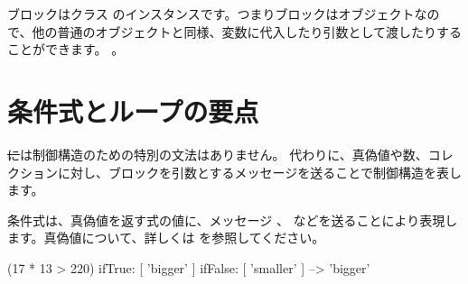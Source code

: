 \documentclass[a4paper,10pt,twoside]{book}
\begin{document}
ブロックはクラス  のインスタンスです。つまりブロックはオブジェクトなので、他の普通のオブジェクトと同様、変数に代入したり引数として渡したりすることができます。
。






\section{条件式とループの要点}

\st には制御構造のための特別の文法はありません。
代わりに、真偽値や数、コレクションに対し、ブロックを引数とするメッセージを送ることで制御構造を表します。

条件式は、真偽値を返す式の値に、メッセージ 、  などを送ることにより表現します。真偽値について、詳しくは を参照してください。

\begin{code}{}
(17 * 13 > 220)
   ifTrue: [ 'bigger' ]
   ifFalse: [ 'smaller' ] --> 'bigger'
\end{code}
\end{document}
